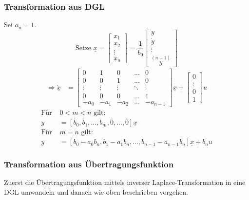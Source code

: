 \documentclass[a4paper,twocolumn,10pt]{article}
\begin{document}
\subsubsection{Transformation aus DGL}
Sei $a_n=1$.
\begin{equation*}
\text{Setze }\underline{x}=\begin{bmatrix}x_1 \\ x_2 \\ \vdots \\ x_n\end{bmatrix}=\frac{1}{b_0}\begin{bmatrix}y \\ \dot{y} \\ \vdots \\ \overset{(n-1)}{y}\end{bmatrix}
\end{equation*}
\begin{equation*}
\begin{split}
\Rightarrow \underline{\dot{x}}&=\begin{bmatrix}0 & 1 & 0 & ... & 0 \\ 0 & 0 & 1 & ... & 0 \\
\vdots & \vdots & \vdots & \ddots & \vdots \\ 0 & 0 & 0 & ... & 1 \\ -a_0 & -a_1 & -a_2 & ... & -a_{n-1}\end{bmatrix}\underline{x}+\begin{bmatrix}0 \\ \vdots \\ 0 \\ 1\end{bmatrix}u
\end{split}
\end{equation*}
\begin{equation*}
\begin{split}
\text{Für }&0<m<n\text{ gilt:}\\
y&=[b_0,b_1,...,b_m,0,...,0]\underline{x}\\
\text{Für }&m=n\text{ gilt:}\\
y&=[b_0-a_0b_n,b_1-a_1b_n,...,b_{n-1}-a_{n-1}b_n]\underline{x}+b_nu
\end{split}
\end{equation*}

\subsubsection{Transformation aus Übertragungsfunktion}
Zuerst die Übertragungsfunktion mittels inverser Laplace-Transformation in eine DGL umwandeln und danach wie oben beschrieben vorgehen.
\end{document}
